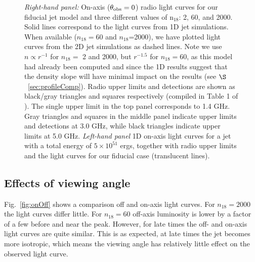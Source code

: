 \documentclass[usenatbib,fleqn]{mnras}
\begin{document}
\begin{figure}
  \caption{\label{fig:lightcurves} \textit{Right-hand panel:} On-axis
    ($\theta_{\rm obs}=0$) radio light curves for our fiducial jet
    model and three different values of n$_{18}$: 2, 60, and
    2000. Solid lines correspond to the light curves from 1D jet
    simulations. When available ($n_{18}=60$ and $n_{18}$=2000), we
    have plotted light curves from the 2D jet simulations as dashed
    lines. Note we use $n\propto r^{-1}$ for $n_{18}=$ 2 and 2000, but
    $r^{-1.5}$ for $n_{18}=60$, as this model had already been
    computed and since the 1D results suggest that the density slope
    will have minimal impact on the results (see
    $\S$~\ref{sec:profileComp}).  Radio upper limits and detections
    are shown as black/gray triangles and squares respectively
    (compiled in Table 1 of \citealt{Mimica+2015}). The single upper
    limit in the top panel corresponds to 1.4 GHz. Gray triangles and
    squares in the middle panel indicate upper limits and detections
    at 3.0 GHz, while black triangles indicate upper limits at 5.0
    GHz. \textit{Left-hand panel} 1D on-axis light curves for a jet
    with a total energy of $5\times 10^{51}$ ergs, together with radio
    upper limits and the light curves for our fiducial case
    (translucent lines).}
\end{figure}

\subsection{Effects of viewing angle}
Fig.~\ref{fig:onOff} shows a comparison off and on-axis light curves.
For $n_{18}=2000$ the light curves differ little.  For $n_{18}=60$
off-axis luminosity is lower by a factor of a few before and near the
peak. However, for late times the off- and on-axis light curves are
quite similar. This is as expected, at late times the jet becomes more
isotropic, which means the viewing angle has relatively little effect
on the observed light curve.
\end{document}
